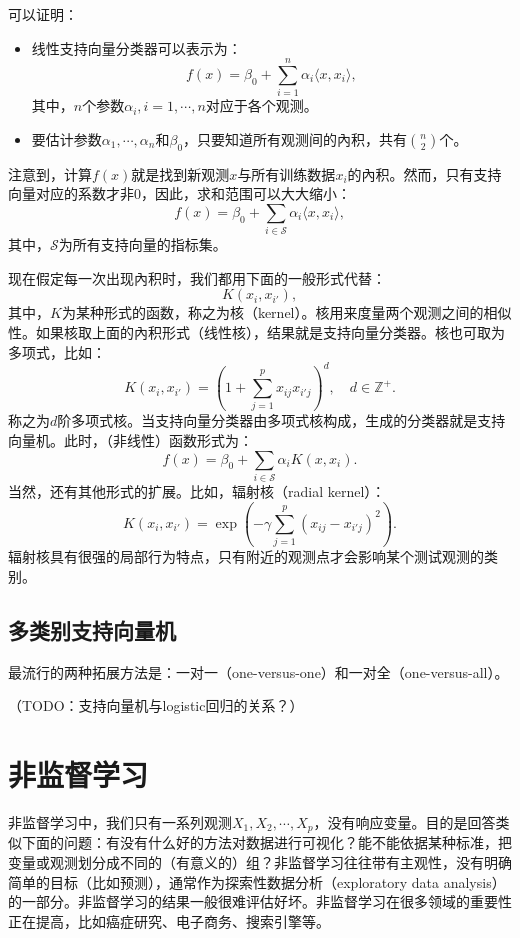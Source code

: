 \documentclass[hyperref,]{ctexart}
\providecommand{\tightlist}{%
  \setlength{\itemsep}{0pt}\setlength{\parskip}{0pt}}
\begin{document}
可以证明：

\begin{itemize}
\tightlist
\item
  线性支持向量分类器可以表示为：
  \[f(x)=\beta_0+\sum_{i=1}^n \alpha_i\langle x,x_i\rangle,\]
  其中，\(n\)个参数\(\alpha_i,i=1,\cdots,n\)对应于各个观测。
\item
  要估计参数\(\alpha_1,\cdots,\alpha_n\)和\(\beta_0\)，只要知道所有观测间的內积，共有\(\binom{n}{2}\)个。
\end{itemize}

注意到，计算\(f(x)\)就是找到新观测\(x\)与所有训练数据\(x_i\)的內积。然而，只有支持向量对应的系数才非0，因此，求和范围可以大大缩小：
\[f(x)=\beta_0 + \sum_{i\in\mathcal{S}}\alpha_i\langle x,x_i\rangle,\]
其中，\(\mathcal{S}\)为所有支持向量的指标集。

现在假定每一次出现內积时，我们都用下面的一般形式代替：
\[K(x_i,x_{i'}),\]
其中，\(K\)为某种形式的函数，称之为核（kernel）。核用来度量两个观测之间的相似性。如果核取上面的內积形式（线性核），结果就是支持向量分类器。核也可取为多项式，比如：
\[K(x_i,x_{i'})=\left(1+\sum_{j=1}^p x_{ij}x_{i'j}\right)^d,\quad d\in \mathbb{Z}^+.\]
称之为\(d\)阶多项式核。当支持向量分类器由多项式核构成，生成的分类器就是支持向量机。此时，（非线性）函数形式为：
\[f(x) = \beta_0+\sum_{i\in\mathcal{S}}\alpha_i K(x,x_i).\]
当然，还有其他形式的扩展。比如，辐射核（radial kernel）：
\[K(x_i,x_{i'})=\exp(-\gamma\sum_{j=1}^p(x_{ij}-x_{i'j})^2).\]
辐射核具有很强的局部行为特点，只有附近的观测点才会影响某个测试观测的类别。

\subsection{多类别支持向量机}

最流行的两种拓展方法是：一对一（one-versus-one）和一对全（one-versus-all）。

（TODO：支持向量机与logistic回归的关系？）

\section{非监督学习}

非监督学习中，我们只有一系列观测\(X_1,X_2,\cdots,X_p\)，没有响应变量。目的是回答类似下面的问题：有没有什么好的方法对数据进行可视化？能不能依据某种标准，把变量或观测划分成不同的（有意义的）组？非监督学习往往带有主观性，没有明确简单的目标（比如预测），通常作为探索性数据分析（exploratory
data
analysis）的一部分。非监督学习的结果一般很难评估好坏。非监督学习在很多领域的重要性正在提高，比如癌症研究、电子商务、搜索引擎等。
\end{document}
